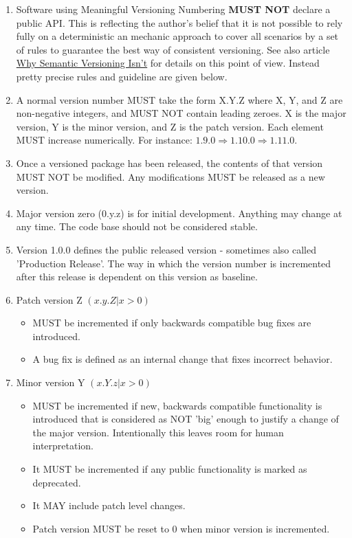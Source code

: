 \documentclass[10pt,a4paper]{article}
\begin{document}
\begin{enumerate}

\item Software using Meaningful Versioning Numbering \textbf{MUST NOT} declare a public API. This is reflecting the author's belief that it is not possible to rely fully on a deterministic an mechanic approach to cover all scenarios by a set of rules to guarantee the best way of consistent versioning. See also article \href{https://gist.github.com/jashkenas/cbd2b088e20279ae2c8e}{Why Semantic Versioning Isn't} for details on this point of view. Instead pretty precise rules and guideline are given below.

\item  A normal version number MUST take the form X.Y.Z where X, Y, and Z are non-negative integers, and MUST NOT contain leading zeroes. X is the major version, Y is the minor version, and Z is the patch version. Each element MUST increase numerically. For instance: $1.9.0 \Rightarrow 1.10.0 \Rightarrow 1.11.0$.

\item Once a versioned package has been released, the contents of that version MUST NOT be modified. Any modifications MUST be released as a new version.

\item Major version zero (0.y.z) is for initial development. Anything may change at any time. The code base should not be considered stable.

\item Version 1.0.0 defines the public released version - sometimes also called 'Production Release'. The way in which the version number is incremented after this release is dependent on this version as baseline.

\item Patch version Z $(x.y.Z | x > 0)$ 
\begin{itemize}
\item MUST be incremented if only backwards compatible bug fixes are introduced.
\item A bug fix is defined as an internal change that fixes incorrect behavior.
\end{itemize}

\item Minor version Y $(x.Y.z | x > 0)$  
\begin{itemize}
\item MUST be incremented if new, backwards compatible functionality is introduced that is considered as NOT 'big' enough to justify a change of the major version. Intentionally this leaves room for human interpretation.
\item It MUST be incremented if any public functionality is marked as deprecated.
\item It MAY include patch level changes.
\item Patch version MUST be reset to 0 when minor version is incremented.
\end{itemize}


\end{enumerate}
\end{document}
